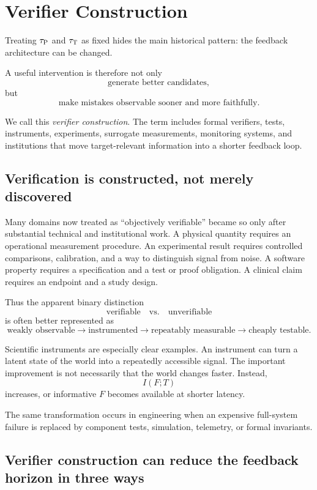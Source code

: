 \section{Verifier Construction}
\label{sec:verifier-construction}

Treating \(\tau_{\mathrm{P}}\) and \(\tau_{\mathrm{T}}\) as fixed hides the main historical pattern: the
feedback architecture can be changed.

A useful intervention is therefore not only
\[
    \text{generate better candidates},
\]
but
\[
    \boxed{\text{make mistakes observable sooner and more faithfully}.}
\]

We call this \emph{verifier construction}.  The term includes formal verifiers, tests,
instruments, experiments, surrogate measurements, monitoring systems, and
institutions that move target-relevant information into a shorter feedback loop.

\subsection{Verification is constructed, not merely discovered}

Many domains now treated as ``objectively verifiable'' became so only after substantial
technical and institutional work.  A physical quantity requires an operational
measurement procedure.  An experimental result requires controlled comparisons,
calibration, and a way to distinguish signal from noise.  A software property requires
a specification and a test or proof obligation.  A clinical claim requires an endpoint
and a study design.

Thus the apparent binary distinction
\[
    \text{verifiable} \quad\text{vs.}\quad \text{unverifiable}
\]
is often better represented as
\[
    \text{weakly observable}
    \rightarrow
    \text{instrumented}
    \rightarrow
    \text{repeatably measurable}
    \rightarrow
    \text{cheaply testable}.
\]

Scientific instruments are especially clear examples.  An instrument can turn a
latent state of the world into a repeatedly accessible signal.  The important
improvement is not necessarily that the world changes faster.  Instead,
\[
    I(F;T)
\]
increases, or informative \(F\) becomes available at shorter latency.

The same transformation occurs in engineering when an expensive full-system failure
is replaced by component tests, simulation, telemetry, or formal invariants.

\subsection{Verifier construction can reduce the feedback horizon in three ways}

